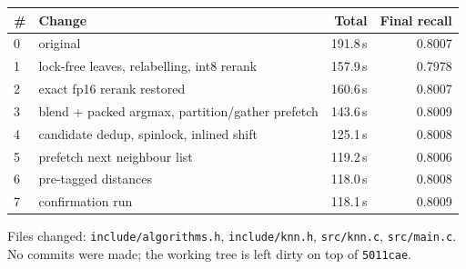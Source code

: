 \documentclass[11pt,a4paper]{article}
\newcommand{\code}[1]{\texttt{\small #1}}
\begin{document}
\begin{center}
\begin{tabular}{llrr}
\toprule
\# & Change & Total & Final recall \\
\midrule
0 & original                                                & 191.8\,s & 0.8007 \\
1 & lock-free leaves, relabelling, int8 rerank              & 157.9\,s & 0.7978 \\
2 & exact fp16 rerank restored                              & 160.6\,s & 0.8007 \\
3 & blend + packed argmax, partition/gather prefetch        & 143.6\,s & 0.8009 \\
4 & candidate dedup, spinlock, inlined shift                & 125.1\,s & 0.8008 \\
5 & prefetch next neighbour list                            & 119.2\,s & 0.8006 \\
6 & pre-tagged distances                                    & 118.0\,s & 0.8008 \\
7 & confirmation run                                        & 118.1\,s & 0.8009 \\
\bottomrule
\end{tabular}
\end{center}

\vspace{1em}
\noindent
Files changed: \code{include/algorithms.h}, \code{include/knn.h},
\code{src/knn.c}, \code{src/main.c}. No commits were made; the working tree is
left dirty on top of \code{5011cae}.
\end{document}
